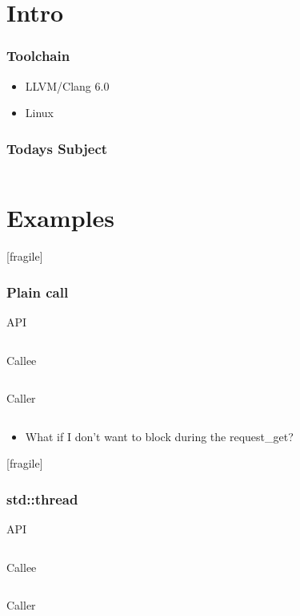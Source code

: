 
\section{Intro}


\begin{frame}[fragile]
\frametitle{Toolchain}
\begin{itemize}
  \item LLVM/Clang 6.0
  \item Linux
\end{itemize}
\end{frame}

\newcommand{\code}[4]{\inputminted[fontsize=\scriptsize,firstline=#1,lastline=#2,xleftmargin=#3]{cpp}{/home/thingdust/src/mixed/src/#4}}

\begin{frame}[fragile]
  \frametitle{Todays Subject}
  \code{12}{16}{10pt}{sync/http_client.h}
\end{frame}


\section{Examples}

\newcommand{\simpleexample}[7]{%
  API 
  \code{#6}{#7}{0pt}{#5/http_client.h}
  \vspace{1mm}
  Callee
  \code{#1}{#2}{0pt}{presentation_examples_test.h}
  \vspace{1mm}
  Caller
  \code{#3}{#4}{-16pt}{presentation_examples_test.cpp}
}

\begin{frame}{[fragile]}
  \frametitle{Plain call}
  \simpleexample{22}{26}{15}{16}{sync}{12}{16}
  \begin{itemize}
    \item What if I don't want to block during the request\_get?
  \end{itemize}
\end{frame}%

\begin{frame}{[fragile]}
  \frametitle{std::thread}
  \simpleexample{30}{39}{22}{23}{threaded}{12}{16}
\end{frame}%


